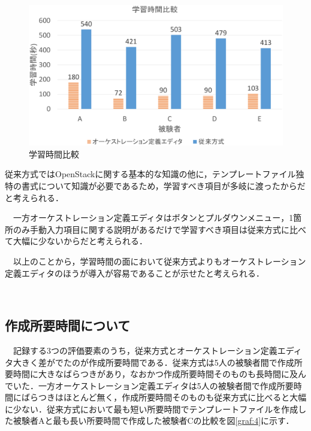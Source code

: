 \documentclass[mingoth]{kut-paper}		%
\begin{document}
			\begin{figure}[H]
				\begin{center}
					\includegraphics[scale=0.42]{Document/studytime_all.eps}
					\caption{学習時間比較}
					\label{graf:8}
				\end{center}
			\end{figure}
		従来方式ではOpenStackに関する基本的な知識の他に，テンプレートファイル独特の書式について知識が必要であるため，学習すべき項目が多岐に渡ったからだと考えられる．
		
		　一方オーケストレーション定義エディタはボタンとプルダウンメニュー，1箇所のみ手動入力項目に関する説明があるだけで学習すべき項目は従来方式に比べて大幅に少ないからだと考えられる．
		
		　以上のことから，学習時間の面において従来方式よりもオーケストレーション定義エディタのほうが導入が容易であることが示せたと考えられる．
		
		　\subsection{作成所要時間について}
		　記録する3つの評価要素のうち，従来方式とオーケストレーション定義エディタ大きく差がでたのが作成所要時間である．従来方式は5人の被験者間で作成所要時間に大きなばらつきがあり，なおかつ作成所要時間そのものも長時間に及んでいた．一方オーケストレーション定義エディタは5人の被験者間で作成所要時間にばらつきはほとんど無く，作成所要時間そのものも従来方式に比べると大幅に少ない．従来方式において最も短い所要時間でテンプレートファイルを作成した被験者Aと最も長い所要時間で作成した被験者Cの比較を図\ref{graf:4}に示す．
		
\end{document}
